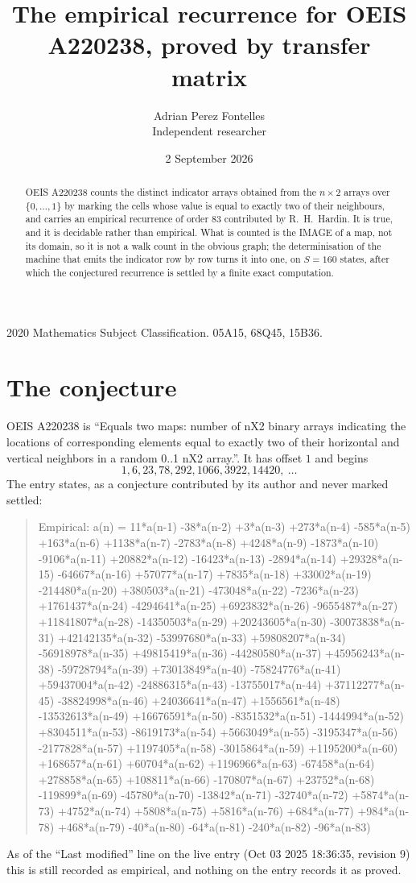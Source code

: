 \documentclass[11pt,a4paper]{article}
\title{The empirical recurrence for OEIS A220238, proved by transfer matrix}
\author{Adrian Perez Fontelles\\ \small Independent researcher}
\date{2 September 2026}
\theoremstyle{plain}
\theoremstyle{definition}
\begin{document}
\maketitle

\begin{abstract}
OEIS A220238 counts the distinct indicator arrays obtained from the $n\times2$ arrays over
$\{0,\dots,1\}$ by marking the cells whose value is equal to exactly two of their neighbours, and carries an
empirical recurrence of order $83$ contributed by R.~H.~Hardin. It is true, and it is
decidable rather than empirical. What is counted is the IMAGE of a map, not its domain, so it
is not a walk count in the obvious graph; the determinisation of the machine that emits the
indicator row by row turns it into one, on $S=160$ states, after which the conjectured
recurrence is settled by a finite exact computation.
\end{abstract}

\noindent\small 2020 Mathematics Subject Classification. 05A15, 68Q45, 15B36.\normalsize

\section{The conjecture}

OEIS A220238 is ``Equals two maps: number of nX2 binary arrays indicating the locations of corresponding elements equal to exactly two of their horizontal and vertical neighbors in a random 0..1 nX2 array.''. It has offset $1$ and begins
\[
1, 6, 23, 78, 292, 1066, 3922, 14420,\ \dots
\]
The entry states, as a conjecture contributed by its author and never marked settled:
\begin{quote}
Empirical: a(n) = 11*a(n-1) -38*a(n-2) +3*a(n-3) +273*a(n-4) -585*a(n-5) +163*a(n-6) +1138*a(n-7) -2783*a(n-8) +4248*a(n-9) -1873*a(n-10) -9106*a(n-11) +20882*a(n-12) -16423*a(n-13) -2894*a(n-14) +29328*a(n-15) -64667*a(n-16) +57077*a(n-17) +7835*a(n-18) +33002*a(n-19) -214480*a(n-20) +380503*a(n-21) -473048*a(n-22) -7236*a(n-23) +1761437*a(n-24) -4294641*a(n-25) +6923832*a(n-26) -9655487*a(n-27) +11841807*a(n-28) -14350503*a(n-29) +20243605*a(n-30) -30073838*a(n-31) +42142135*a(n-32) -53997680*a(n-33) +59808207*a(n-34) -56918978*a(n-35) +49815419*a(n-36) -44280580*a(n-37) +45956243*a(n-38) -59728794*a(n-39) +73013849*a(n-40) -75824776*a(n-41) +59437004*a(n-42) -24886315*a(n-43) -13755017*a(n-44) +37112277*a(n-45) -38824998*a(n-46) +24036641*a(n-47) +1556561*a(n-48) -13532613*a(n-49) +16676591*a(n-50) -8351532*a(n-51) -1444994*a(n-52) +8304511*a(n-53) -8619173*a(n-54) +5663049*a(n-55) -3195347*a(n-56) -2177828*a(n-57) +1197405*a(n-58) -3015864*a(n-59) +1195200*a(n-60) +168657*a(n-61) +60704*a(n-62) +1196966*a(n-63) -67458*a(n-64) +278858*a(n-65) +108811*a(n-66) -170807*a(n-67) +23752*a(n-68) -119899*a(n-69) -45780*a(n-70) -13842*a(n-71) -32740*a(n-72) +5874*a(n-73) +4752*a(n-74) +5808*a(n-75) +5816*a(n-76) +684*a(n-77) +984*a(n-78) +468*a(n-79) -40*a(n-80) -64*a(n-81) -240*a(n-82) -96*a(n-83)
\end{quote}
As of the ``Last modified'' line on the live entry (Oct 03 2025 18:36:35, revision 9) this is still
recorded as empirical, and nothing on the entry records it as proved.
\end{document}
